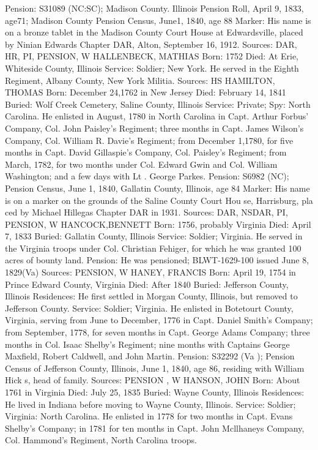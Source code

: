 Pension: S31089 (NC:SC); Madison County. Illinois Pension Roll, April 9, 1833, age71; Madison County Pension Census, June1, 1840, age 88 
Marker: His name is on a bronze tablet in the Madison County Court House at Edwardsville, placed by Ninian Edwards Chapter DAR, Alton, September 16, 1912. 
Sources: DAR, HR, PI, PENSION, W 
HALLENBECK, MATHIAS 
Born: 1752 
Died: At Erie, Whiteside County, Illinois 
Service: Soldier; New York. He served in the Eighth Regiment, Albany County, New York Militia. 
Sources: HS 
HAMILTON, THOMAS 
Born: December 24,1762 in New Jersey 
Died: February 14, 1841 
Buried: Wolf Creek Cemetery, Saline County, Illinois 
Service: Private; Spy: North Carolina. He enlisted in August, 1780 in North Carolina in Capt. Arthur Forbus' Company, Col. John Paisley's Regiment; three months in Capt. James Wilson's Company, Col. William R. Davie's Regiment; from December 1,1780, for five months in Capt. David Gillaspie's Company, Col. Paisley's Regiment; from March, 1782, for two months under Col. Edward Gwin and Col. William Washington; and a few days with Lt . George Parkes. 
Pension: S6982 (NC); Pension Census, June 1, 1840, Gallatin County, Illinois, age 84 Marker: His name is on a marker on the grounds of the Saline County Court Hou se, Harrisburg, pla ced by Michael Hillegas Chapter DAR in 1931. 
Sources: DAR, NSDAR, PI, PENSION, W 
HANCOCK,BENNETT 
Born: 1756, probably Virginia 
Died: April 7, 1833 Buried: Gallatin County, Illinois 
Service: Soldier; Virginia. He served in the Virginia troops under Col. Christian Fehiger, for which he was granted 100 acres of bounty land. 
Pension: He was pensioned; BLWT-1629-100 issued June 8, 1829(Va) 
Sources: PENSION, W 
HANEY, FRANCIS 
Born: April 19, 1754 in Prince Edward County, Virginia 
Died: After 1840 Buried: Jefferson County, Illinois 
Residences: He first settled in Morgan County, Illinois, but removed to Jefferson County. 
Service: Soldier; Virginia. He enlisted in Botetourt County, Virginia, serving from June to December, 1776 in Capt. Daniel Smith's Company; from September, 1778, for seven months in Capt. George Adams Company; three months in Col. Isaac Shelby's Regiment; nine months with Captains George Maxfield, Robert Caldwell, and John Martin. Pension: S32292 (Va ); Pension Census of Jefferson County, Illinois, June 1, 1840, age 86, residing with William Hick s, head of family. 
Sources: PENSION , W 
HANSON, JOHN 
Born: About 1761 in Virginia 
Died: July 25, 1835 
Buried: Wayne County, Illinois Residences: He lived in Indiana before moving to Wayne County, Illinois. 
Service: Soldier; Virginia: North Carolina. He enlisted in 1778 for two months in Capt. Evans Shelby's Company; in 1781 for ten months in Capt. John  Mcllhaneys Company, Col. Hammond's Regiment, North Carolina troops. 
